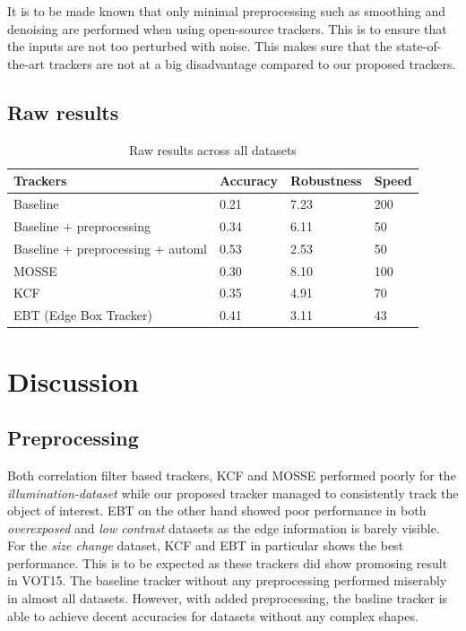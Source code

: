 \documentclass[hyp]{socreport}
\begin{document}
It is to be made known that only minimal preprocessing such as smoothing and
denoising are performed when using open-source trackers. This is to ensure that
the inputs are not too perturbed with noise. This makes sure that the
state-of-the-art trackers are not at a big disadvantage compared to our proposed trackers. 

\subsection{Raw results}

\begin{table}[H]
\centering
\begin{tabular}{|l|l|l|l|}
\hline
Trackers                           & Accuracy & Robustness & Speed \\ \hline
Baseline                           & 0.21     & 7.23       & 200   \\ \hline
Baseline + preprocessing           & 0.34     & 6.11       & 50    \\ \hline
Baseline + preprocessing +  automl & 0.53     & 2.53       & 50    \\ \hline
MOSSE                              & 0.30     & 8.10       & 100   \\ \hline
KCF                                & 0.35     & 4.91       & 70    \\ \hline
EBT (Edge Box Tracker)             & 0.41     & 3.11       & 43    \\ \hline
\end{tabular}
\caption{Raw results across all datasets}
\label{table:raw_results}
\end{table}

\section{Discussion}
  
\subsection{Preprocessing}

Both correlation filter based trackers, KCF and MOSSE performed poorly for the
\textit{illumination-dataset} while our proposed tracker managed to consistently
track the object of interest. EBT on the other hand showed poor performance in
both \textit{overexposed} and \textit{low contrast} datasets as the edge
information is barely visible. For the \textit{size change} dataset, KCF and EBT in
particular shows the best performance. This is to be expected as these trackers
did show promosing result in VOT15. The baseline tracker without any
preprocessing performed miserably in almost all datasets. However, with added
preprocessing, the basline tracker is able to achieve decent accuracies for
datasets without any complex shapes.
\end{document}
